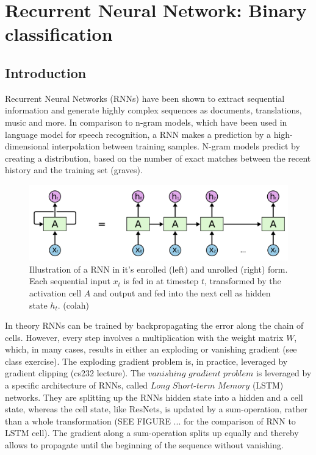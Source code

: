 
\section{Recurrent Neural Network: Binary classification} \label{sec:rnn_clf}

\subsection{Introduction}

Recurrent Neural Networks (RNNs) have been shown to extract sequential information and generate highly complex sequences as documents, translations, music and more. In comparison to n-gram models, which have been used in language model for speech recognition, a RNN makes a prediction by a high-dimensional interpolation between training samples. N-gram models predict by creating a distribution, based on the number of exact matches between the recent history and the training set (graves). 


\begin{figure}
	\centering
	\includegraphics [trim=0 0 0 0, clip, angle=0, width=0.8\columnwidth,
	keepaspectratio]{figures/rnn_unrolled}
	\caption{Illustration of a RNN in it's enrolled (left) and unrolled (right) form. Each sequential input $x_t$ is fed in at timestep $t$, transformed by the activation cell $A$ and output and fed into the next cell as hidden state $h_t$. (colah)} 
	\label{fig:rnn_unrolled} 
\end{figure}

In theory RNNs can be trained by backpropagating the error along the chain of cells. However, every step involves a multiplication with the weight matrix $W$, which, in many cases, results in either an exploding or vanishing gradient (see class exercise). The exploding gradient problem is, in practice, leveraged by gradient clipping (cs232 lecture). The $\textit{vanishing gradient problem}$ is leveraged by a specific architecture of RNNs, called $\textit{Long Short-term Memory}$ (LSTM) networks. They are splitting up the RNNs hidden state into a hidden and a cell state, whereas the cell state, like ResNets, is updated by a sum-operation, rather than a whole transformation (SEE FIGURE ... for the comparison of RNN to LSTM cell). The gradient along a sum-operation splits up equally and thereby allows to propagate until the beginning of the sequence without vanishing.

